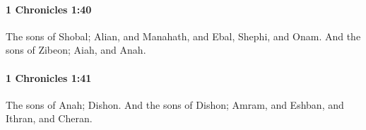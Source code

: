 		\paragraph{1 Chronicles 1:40} %
			\label{1CHRONICLES-1-40}

			The sons of Shobal; Alian, and Manahath, and Ebal, Shephi, and Onam. And the sons of Zibeon; Aiah, and Anah.


		\paragraph{1 Chronicles 1:41} %
			\label{1CHRONICLES-1-41}

			The sons of Anah; Dishon. And the sons of Dishon; Amram, and Eshban, and Ithran, and Cheran.


